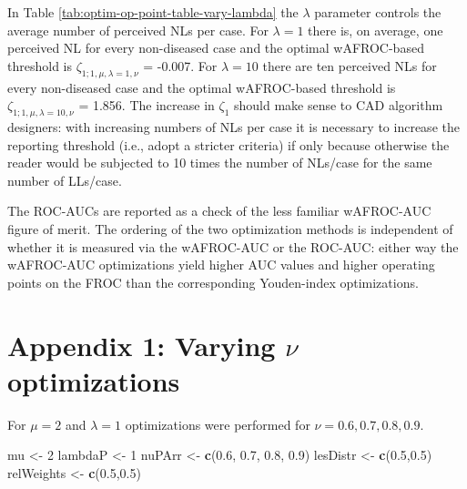 \documentclass[
]{book}
\newenvironment{Shaded}{\begin{snugshade}}{\end{snugshade}}
\newcommand{\DecValTok}[1]{\textcolor[rgb]{0.00,0.00,0.81}{#1}}
\newcommand{\FloatTok}[1]{\textcolor[rgb]{0.00,0.00,0.81}{#1}}
\newcommand{\KeywordTok}[1]{\textcolor[rgb]{0.13,0.29,0.53}{\textbf{#1}}}
\newcommand{\NormalTok}[1]{#1}
\newcommand{\StringTok}[1]{\textcolor[rgb]{0.31,0.60,0.02}{#1}}
\begin{document}
In Table \ref{tab:optim-op-point-table-vary-lambda} the \(\lambda\) parameter controls the average number of perceived NLs per case. For \(\lambda = 1\) there is, on average, one perceived NL for every non-diseased case and the optimal wAFROC-based threshold is \(\zeta_{1;1,\mu, \lambda = 1, \nu}\) = -0.007. For \(\lambda = 10\) there are ten perceived NLs for every non-diseased case and the optimal wAFROC-based threshold is \(\zeta_{1;1,\mu, \lambda = 10, \nu}\) = 1.856. The increase in \(\zeta_1\) should make sense to CAD algorithm designers: with increasing numbers of NLs per case it is necessary to increase the reporting threshold (i.e., adopt a stricter criteria) if only because otherwise the reader would be subjected to 10 times the number of NLs/case for the same number of LLs/case.

The ROC-AUCs are reported as a check of the less familiar wAFROC-AUC figure of merit. The ordering of the two optimization methods is independent of whether it is measured via the wAFROC-AUC or the ROC-AUC: either way the wAFROC-AUC optimizations yield higher AUC values and higher operating points on the FROC than the corresponding Youden-index optimizations.

\hypertarget{optim-op-point-vary-nu}{%
\section{\texorpdfstring{Appendix 1: Varying \(\nu\) optimizations}{Appendix 1: Varying \textbackslash nu optimizations}}\label{optim-op-point-vary-nu}}

For \(\mu = 2\) and \(\lambda = 1\) optimizations were performed for \(\nu = 0.6, 0.7, 0.8, 0.9\).

\begin{Shaded}
\begin{Highlighting}[]
\NormalTok{mu <-}\StringTok{ }\DecValTok{2}
\NormalTok{lambdaP <-}\StringTok{ }\DecValTok{1}
\NormalTok{nuPArr <-}\StringTok{ }\KeywordTok{c}\NormalTok{(}\FloatTok{0.6}\NormalTok{, }\FloatTok{0.7}\NormalTok{, }\FloatTok{0.8}\NormalTok{, }\FloatTok{0.9}\NormalTok{)}
\NormalTok{lesDistr <-}\StringTok{ }\KeywordTok{c}\NormalTok{(}\FloatTok{0.5}\NormalTok{,}\FloatTok{0.5}\NormalTok{)}
\NormalTok{relWeights <-}\StringTok{ }\KeywordTok{c}\NormalTok{(}\FloatTok{0.5}\NormalTok{,}\FloatTok{0.5}\NormalTok{)}
\end{Highlighting}
\end{Shaded}
\end{document}
